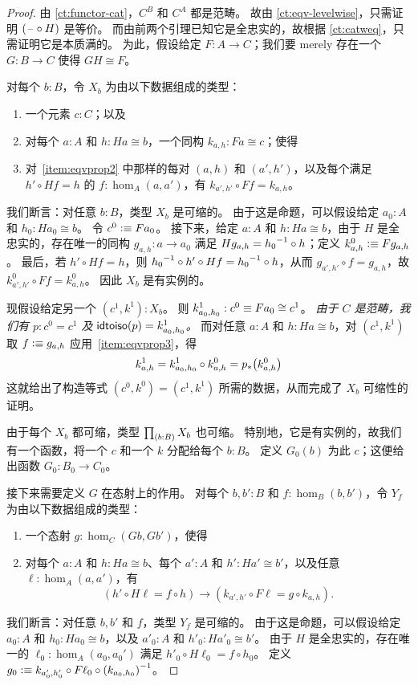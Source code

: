 \begin{proof}
  由 \cref{ct:functor-cat}，$C^B$ 和 $C^A$ 都是范畴。
  故由 \cref{ct:eqv-levelwise}，只需证明 $(\mathord{\hspace{1pt}\text{--}\hspace{1pt}}\circ H)$ 是等价。
  而由前两个引理已知它是全忠实的，故根据 \cref{ct:catweq}，只需证明它是本质满的。
  为此，假设给定 $F:A\to C$；我们要 merely 存在一个 $G:B\to C$ 使得 $GH\cong F$。

  对每个 $b:B$，令 $X_b$ 为由以下数据组成的类型：
  \begin{enumerate}
  \item 一个元素 $c:C$；以及
  \item 对每个 $a:A$ 和 $h:Ha\cong b$，一个同构 $k_{a,h}:Fa\cong c$；使得\label{item:eqvprop2}
  \item 对~\ref{item:eqvprop2} 中那样的每对 $(a,h)$ 和 $(a',h')$，以及每个满足 $h'\circ Hf = h$ 的 $f:\hom_A(a,a')$，有 $k_{a',h'}\circ Ff = k_{a,h}$。\label{item:eqvprop3}
  \end{enumerate}
  我们断言：对任意 $b:B$，类型 $X_b$ 是可缩的。
  由于这是命题，可以假设给定 $a_0:A$ 和 $h_0:Ha_0 \cong b$。
  令 $c^0\vcentcolon\equiv Fa_0$。
  接下来，给定 $a:A$ 和 $h:Ha\cong b$，由于 $H$ 是全忠实的，存在唯一的同构 $g_{a,h}:a\to a_0$ 满足 $Hg_{a,h} = {h_0}^{-1}\circ h$；定义 $k^0_{a,h} \vcentcolon\equiv Fg_{a,h}$。
  最后，若 $h'\circ Hf = h$，则 ${h_0}^{-1}\circ h'\circ Hf = {h_0}^{-1}\circ h$，从而 $g_{a',h'} \circ f = g_{a,h}$，故 $k^0_{a',h'}\circ Ff = k^0_{a,h}$。
  因此 $X_b$ 是有实例的。

  现假设给定另一个 $(c^1,k^1): X_b$。
  则 $k^1_{a_0,h_0}:c^0 \equiv Fa_0 \cong c^1$。
  \emph{由于 $C$ 是范畴，我们有 $p:c^0=c^1$ 及 $\mathsf{idtoiso}(p) = k^1_{a_0,h_0}$。}
  而对任意 $a:A$ 和 $h:Ha\cong b$，对 $(c^1,k^1)$ 取 $f\vcentcolon\equiv g_{a,h}$ 应用~\ref{item:eqvprop3}，得
  \[k^1_{a,h} = k^1_{a_0,h_0} \circ k^0_{a,h} = {p}_{*}\mathopen{}\left({k^0_{a,h}}\right)\mathclose{}\]
  这就给出了构造等式 $(c^0,k^0)=(c^1,k^1)$ 所需的数据，从而完成了 $X_b$ 可缩性的证明。

  由于每个 $X_b$ 都可缩，类型 $\prd{b:B} X_b$ 也可缩。
  特别地，它是有实例的，故我们有一个函数，将一个 $c$ 和一个 $k$ 分配给每个 $b:B$。
  定义 $G_0(b)$ 为此 $c$；这便给出函数 $G_0 :B_0 \to C_0$。

  接下来需要定义 $G$ 在态射上的作用。
  对每个 $b,b':B$ 和 $f:\hom_B(b,b')$，令 $Y_f$ 为由以下数据组成的类型：
  \begin{enumerate}[resume]
  \item 一个态射 $g:\hom_C(Gb,Gb')$，使得
  \item 对每个 $a:A$ 和 $h:Ha\cong b$、每个 $a':A$ 和 $h':Ha'\cong b'$，以及任意 $\ell:\hom_A(a,a')$，有\label{item:eqvprop5}
    \[ (h' \circ H\ell = f \circ h)
    \to
    (k_{a',h'} \circ F\ell = g\circ k_{a,h}). \]
  \end{enumerate}
  我们断言：对任意 $b,b'$ 和 $f$，类型 $Y_f$ 是可缩的。
  由于这是命题，可以假设给定 $a_0:A$ 和 $h_0:Ha_0\cong b$，以及 $a'_0:A$ 和 $h'_0:Ha'_0\cong b'$。
  由于 $H$ 是全忠实的，存在唯一的 $\ell_0:\hom_A(a_0,a_0')$ 满足 $h'_0 \circ H\ell_0 = f \circ h_0$。
  定义 $g_0 \vcentcolon\equiv k_{a_0',h_0'} \circ F \ell_0 \circ {(k_{a_0,h_0})}^{-1}$。


\end{proof}
